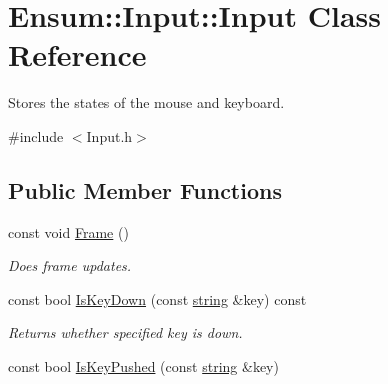 \hypertarget{class_ensum_1_1_input_1_1_input}{}\section{Ensum\+:\+:Input\+:\+:Input Class Reference}
\label{class_ensum_1_1_input_1_1_input}


Stores the states of the mouse and keyboard.  




{\ttfamily \#include $<$Input.\+h$>$}

\subsection*{Public Member Functions}
\begin{DoxyCompactItemize}
\item 
const void \hyperlink{class_ensum_1_1_input_1_1_input_aade076509ba0a3b50a5f60b0fbeedf3b}{Frame} ()
\begin{DoxyCompactList}\small\item\em Does frame updates. \end{DoxyCompactList}\item 
const bool \hyperlink{class_ensum_1_1_input_1_1_input_a25c79ca7bc0431a761f7e78f0e090a76}{Is\+Key\+Down} (const \hyperlink{class_ensum_1_1string}{string} \&key) const \hypertarget{class_ensum_1_1_input_1_1_input_a25c79ca7bc0431a761f7e78f0e090a76}{}\label{class_ensum_1_1_input_1_1_input_a25c79ca7bc0431a761f7e78f0e090a76}

\begin{DoxyCompactList}\small\item\em Returns whether specified key is down. \end{DoxyCompactList}\item 
const bool \hyperlink{class_ensum_1_1_input_1_1_input_a746c3971d39a1130d6e7c3e7110b2327}{Is\+Key\+Pushed} (const \hyperlink{class_ensum_1_1string}{string} \&key)\hypertarget{class_ensum_1_1_input_1_1_input_a746c3971d39a1130d6e7c3e7110b2327}{}\label{class_ensum_1_1_input_1_1_input_a746c3971d39a1130d6e7c3e7110b2327}


\end{DoxyCompactItemize}
